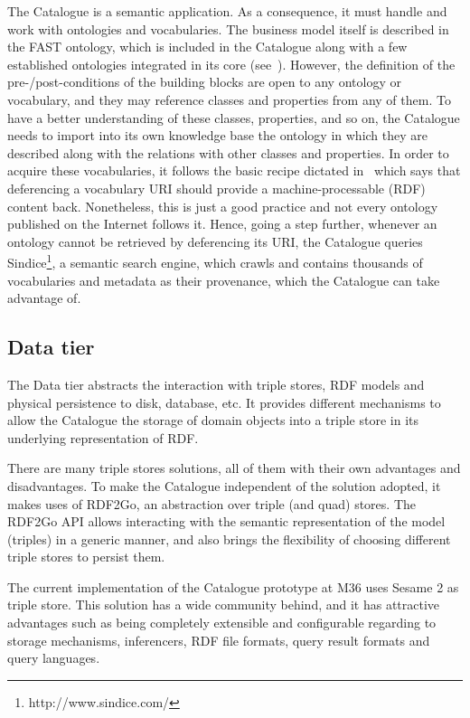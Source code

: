 \documentclass{fast_latex}
\begin{document}
The Catalogue is a semantic application. As a consequence, it must handle and work with ontologies and vocabularies. The business model itself is described in the FAST ontology, which is included in the Catalogue along with a few established ontologies integrated in its core (see~\cite{moeller2011fast_ontology}). However, the definition of the pre-/post-conditions of the building blocks are open to any ontology or vocabulary, and they may reference classes and properties from any of them. To have a better understanding of these classes, properties, and so on, the Catalogue needs to import into its own knowledge base the ontology in which they are described along with the relations with other classes and properties. In order to acquire these vocabularies, it follows the basic recipe dictated in~\cite{berrueta2008} which says that deferencing a vocabulary URI should provide a machine-processable (RDF) content back. Nonetheless, this is just a good practice and not every ontology published on the Internet follows it. Hence, going a step further, whenever an ontology cannot be retrieved by deferencing its URI, the Catalogue queries Sindice\footnote{http://www.sindice.com/}, a semantic search engine, which crawls and contains thousands of vocabularies and metadata as their provenance, which the Catalogue can take advantage of.


\subsection{Data tier}

The Data tier abstracts the interaction with triple stores, RDF models and physical persistence to disk, database, etc. It provides different mechanisms to allow the Catalogue the storage of domain objects into a triple store in its underlying representation of RDF.

There are many triple stores solutions, all of them with their own advantages and disadvantages. To make the Catalogue independent of the solution adopted, it makes uses of RDF2Go, an abstraction over triple (and quad) stores. The RDF2Go API allows interacting with the semantic representation of the model (triples) in a generic manner, and also brings the flexibility of choosing different triple stores to persist them.

The current implementation of the Catalogue prototype at M36 uses Sesame 2 as triple store. This solution has a wide community behind, and it has attractive advantages such as being completely extensible and configurable regarding to storage mechanisms, inferencers, RDF file formats, query result formats and query languages.
\end{document}
